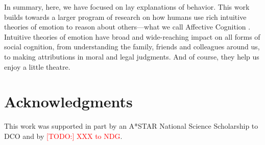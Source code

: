 \documentclass[10pt,letterpaper]{article}
\newcommand{\red}[1]{\textcolor{Red}{#1}}
\begin{document}


In summary, here, we have focused on lay explanations of behavior. This work builds towards a larger program of research on how humans use rich intuitive theories of emotion to reason about others---what we call Affective Cognition \cite{Ong2015AffCog}. Intuitive theories of emotion have broad and wide-reaching impact on all forms of social cognition, from understanding the family, friends and colleagues around us, to making attributions in moral and legal judgments. And of course, they help us enjoy a little theatre. 




\section{Acknowledgments}

This work was supported in part by an A*STAR National Science Scholarship to DCO and by \red{[TODO:] XXX to NDG}.




\setlength{\bibleftmargin}{.125in}
\setlength{\bibindent}{-\bibleftmargin}


\end{document}
